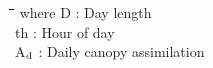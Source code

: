 \documentclass[11pt]{article}
\begin{document}
\bigskip
\bigskip
\bigskip
\nwln
\begin{tabbing}
\hspace{1.27cm}\=\hspace{1.27cm}\=\hspace{1.27cm}\=\hspace{1.27cm}\=%
\hspace{1.27cm}\=\hspace{1.27cm}\=\hspace{1.27cm}\=\hspace{1.27cm}\=%
\hspace{1.27cm}\=\hspace{1.27cm}\=\kill
where\> D\> : Day length \> \> \> \> \> \> \> \> [h]\\
\>th\> : Hour of day\> \> \> \> \> \> \> \> [h]\\
\>A$_{{\rm d}}$\> : Daily canopy assimilation \> \> \> \> \> \> \> \> [g CO$_{{\rm 2}}$ m$^{{\rm -2}}$ d$^{{\rm -1}}$]
\end{tabbing}
\end{document}
